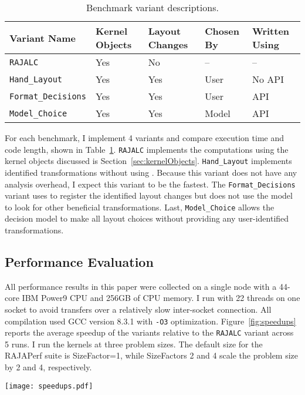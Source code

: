 \begin{table}
	\centering
	\begin{tabular}{| p{2.4cm} | p{1.1cm} | p{1.1cm} | p{1cm} | p{1cm}|}
		\hline
			\raggedright Variant \linebreak Name & \raggedright Kernel Objects & \raggedright Layout Changes & \raggedright Chosen By &  Written Using \tabularnewline
		\hline
		\verb.RAJALC. & Yes & No & -- & -- \\
		\verb.Hand_Layout. & Yes & Yes & User & No API \\
		\verb.Format_Decisions. & Yes & Yes & User & API \\
		\verb.Model_Choice. & Yes & Yes & Model & API \\
		\hline
	\end{tabular}
	\caption{Benchmark variant descriptions.}\label{VariantDescription}
\end{table}
For each benchmark, I implement 4 variants and compare execution time and code length, shown in Table~\ref{VariantDescription}.
\verb.RAJALC. implements the computations using the kernel objects discussed is Section~\ref{sec:kernelObjects}. 
\verb.Hand_Layout. implements identified transformations without using \FormatDecisions. 
Because this variant does not have any analysis overhead, I expect this variant to be the fastest.
The \verb.Format_Decisions. variant uses \FormatDecisions to register the identified layout changes but does not use the model to look for other beneficial transformations.
Last, \verb.Model_Choice. allows the decision model to make all layout choices without providing any user-identified transformations.

\subsection{Performance Evaluation}\label{sec:systemDetails}
All performance results in this paper were collected on a single node with a 44-core IBM Power9 CPU and 256GB of CPU memory. 
I run with 22 threads on one socket to avoid transfers over a relatively slow inter-socket connection.
All compilation used GCC version 8.3.1 with \verb.-O3. optimization.
Figure~\ref{fig:speedups} reports the average speedup of the variants relative to the \verb.RAJALC. variant across 5 runs. 
I run the kernels at three problem sizes.
The default size for the RAJAPerf suite is SizeFactor=1, while SizeFactors 2 and 4 scale the problem size by 2 and 4, respectively.

\begin{figure*}
	\texttt{[image: speedups.pdf]}
	\caption{Relative speedups of the different variants for different problem size factors. Speedup is calculated in reference to the RAJALC variant. Higher is better.}\label{fig:speedups}
\end{figure*}

